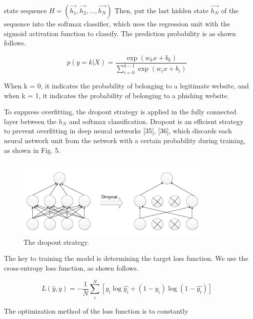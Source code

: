 \documentclass{ieeeaccess}
\begin{document}
state sequence $H =(\overrightarrow{h_{1}}, \overrightarrow{h_{2}}, \ldots, \overrightarrow{h_{N}})$ Then, put the last
hidden state $\overrightarrow{h_{N}}$ of the sequence into the softmax classifier,
which uses the regression unit with the sigmoid activation function to classify. The prediction probability is as shown follows. \par 
\begin{equation}
p(y=k | X)=\frac{\exp \left(w_{k} x+b_{k}\right)}{\sum_{i=0}^{k-1} \exp \left(w_{i} x+b_{i}\right)}
\end{equation}\par
When k = 0, it indicates the probability of belonging
to a legitimate website, and when k = 1, it indicates the
probability of belonging to a phishing website.
\par To suppress overfitting, the dropout strategy is applied in
the fully connected layer between the $h_{N}$ and softmax classification. Dropout is an efficient strategy to prevent overfitting in deep neural networks [35], [36], which discards each neural network unit from the network with a certain probability during training, as shown in Fig. 5.\begin{figure}
    \centering
    \includegraphics[width=\linewidth]{figure5.png}
    \caption{The dropout strategy.}
    \label{fig:5}
\end{figure} \par The key to training the model is determining the target loss
function. We use the cross-entropy loss function, as shown follows. \vspace{6pt} \par \begin{equation}
L(\widehat{y}, y)=-\frac{1}{N} \sum_{i}^{N}\left[y_{i} \log \widehat{y_{i}}+\left(1-y_{i}\right) \log (1-\widehat{y_{i}})\right]
\end{equation}
\vspace{6pt} \par The optimization method of the loss function is to constantly
\end{document}
